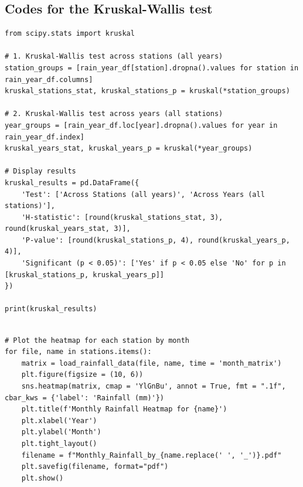 \documentclass[12pt]{article}
\theoremstyle{definition}
\begin{document}
\subsection{Codes for the Kruskal-Wallis test}
\begin{verbatim}
from scipy.stats import kruskal

# 1. Kruskal-Wallis test across stations (all years)
station_groups = [rain_year_df[station].dropna().values for station in rain_year_df.columns]
kruskal_stations_stat, kruskal_stations_p = kruskal(*station_groups)

# 2. Kruskal-Wallis test across years (all stations)
year_groups = [rain_year_df.loc[year].dropna().values for year in rain_year_df.index]
kruskal_years_stat, kruskal_years_p = kruskal(*year_groups)

# Display results
kruskal_results = pd.DataFrame({
    'Test': ['Across Stations (all years)', 'Across Years (all stations)'],
    'H-statistic': [round(kruskal_stations_stat, 3), round(kruskal_years_stat, 3)],
    'P-value': [round(kruskal_stations_p, 4), round(kruskal_years_p, 4)],
    'Significant (p < 0.05)': ['Yes' if p < 0.05 else 'No' for p in [kruskal_stations_p, kruskal_years_p]]
})

print(kruskal_results)
   
\end{verbatim}
\begin{verbatim}
# Plot the heatmap for each station by month
for file, name in stations.items():
    matrix = load_rainfall_data(file, name, time = 'month_matrix')
    plt.figure(figsize = (10, 6))
    sns.heatmap(matrix, cmap = 'YlGnBu', annot = True, fmt = ".1f", cbar_kws = {'label': 'Rainfall (mm)'})
    plt.title(f'Monthly Rainfall Heatmap for {name}')
    plt.xlabel('Year')
    plt.ylabel('Month')
    plt.tight_layout()
    filename = f"Monthly_Rainfall_by_{name.replace(' ', '_')}.pdf"
    plt.savefig(filename, format="pdf")
    plt.show()
\end{verbatim}
\end{document}
